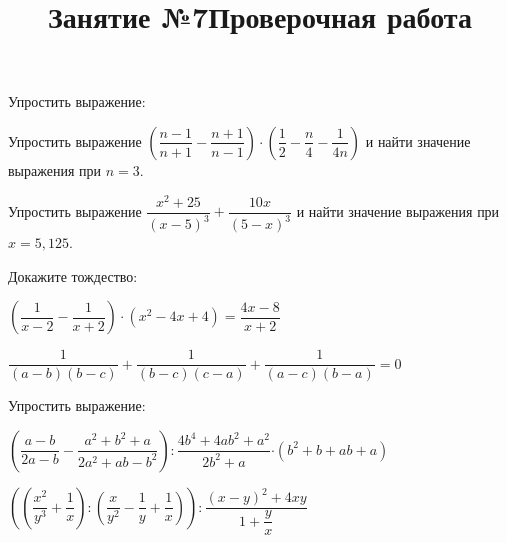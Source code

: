 \newpage
\title{Занятие №7}
\begin{listofex}
	\item Упростить выражение:
	\begin{enumcols}[itemcolumns=2]
		\item {}
		\item {}
	\end{enumcols}
	\item Упростить выражение \( \left( \dfrac{n-1}{n+1}-\dfrac{n+1}{n-1} \right)\cdot\left( \dfrac{1}{2}-\dfrac{n}{4}-\dfrac{1}{4n} \right) \) и найти значение выражения при \( n=3 \). 
	\item Упростить выражение \( \dfrac{x^2+25}{(x-5)^3}+\dfrac{10x}{(5-x)^3} \) и найти значение выражения при \( x=5,125 \). 
	\item Докажите тождество:
	\begin{enumcols}[itemcolumns=1]
		\item \( \left( \dfrac{1}{x-2}-\dfrac{1}{x+2} \right)\cdot(x^2-4x+4)=\dfrac{4x-8}{x+2} \)
		\item \( \dfrac{1}{(a-b)(b-c)}+\dfrac{1}{(b-c)(c-a)}+\dfrac{1}{(a-c)(b-a)}=0 \)
	\end{enumcols}
	\item Упростить выражение:
	\begin{enumcols}[itemcolumns=1]
		\item \( \left( \dfrac{a-b}{2a-b}-\dfrac{a^2+b^2+a}{2a^2+ab-b^2} \right):\dfrac{4b^4+4ab^2+a^2}{2b^2+a}{\cdot(b^2+b+ab+a)} \) 
		\item \( \left( \left( \dfrac{x^2}{y^3}+\dfrac{1}{x} \right):\left( \dfrac{x}{y^2}-\dfrac{1}{y}+\dfrac{1}{x} \right) \right):\dfrac{(x-y)^2+4xy}{1+\dfrac{y}{x}} \) 
	\end{enumcols}
\end{listofex}
\newpage
%	
%	
\newpage
\title{Проверочная работа}
